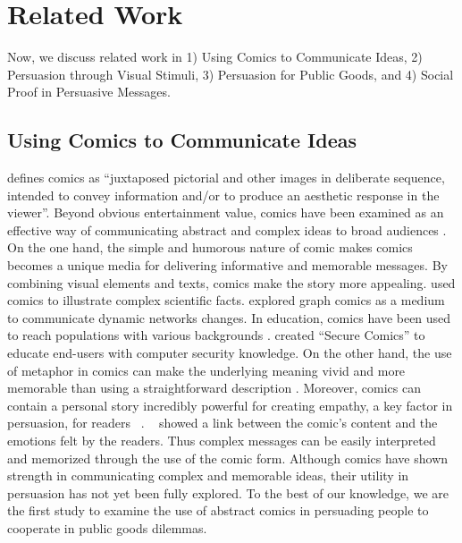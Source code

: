 \section{Related Work}
\label{sec:relatedwork}
Now, we discuss related work in 1) Using Comics to Communicate Ideas, 2) Persuasion through Visual Stimuli, 3) Persuasion for Public Goods, and 4) Social Proof in Persuasive Messages.

\subsection{Using Comics to Communicate Ideas}
\textcite{scott1993understanding} defines comics as ``juxtaposed pictorial and other images in deliberate sequence, intended to convey information and/or to produce an aesthetic response in the viewer''. Beyond obvious entertainment value, comics have been examined as an effective way of communicating abstract and complex ideas to broad audiences \cite{McDermottPB18,cary2004going,scott1993understanding, Zhang-Kennedy:2017:SCI:3206217.3206282}. On the one hand, the simple and humorous nature of comic makes comics becomes a unique media for delivering informative and memorable messages. By combining visual elements and texts, comics make the story more appealing. \textcite{McDermottPB18} used comics to illustrate complex scientific facts. \textcite{Bach2016} explored graph comics as a medium to communicate dynamic networks changes. In education, comics have been used to reach populations with various backgrounds \cite{McDermottPB18,cary2004going,scott1993understanding}. \textcite{Zhang-Kennedy:2017:SCI:3206217.3206282} created ``Secure Comics'' to educate end-users with computer security knowledge. On the other hand, the use of metaphor in comics can make the underlying meaning vivid and more memorable than using a straightforward description \cite{McDermottPB18,scott1993understanding}. Moreover, comics can contain a personal story incredibly powerful for creating empathy, a key factor in persuasion, for readers ~\cite{weaver2017losing}. ~\textcite{matsubara2016emotional} showed a link between the comic's content and the emotions felt by the readers. Thus complex messages can be easily interpreted and memorized through the use of the comic form. Although comics have shown strength in communicating complex and memorable ideas, their utility in persuasion has not yet been fully explored. To the best of our knowledge, we are the first study to examine the use of abstract comics in persuading people to cooperate in public goods dilemmas.  

